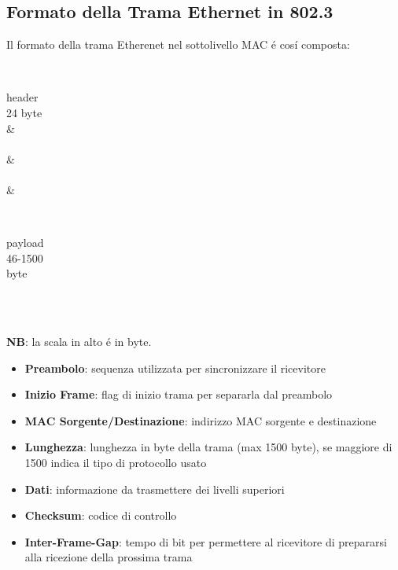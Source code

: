 \documentclass[12pt]{article}
\begin{document}
\clearpage
\subsection{Formato della Trama Ethernet in 802.3}\label{ieee-802-formato-trama-ethernet-802.3}
Il formato della trama Etherenet nel sottolivello MAC \'e cos\'i composta:\\
\begin{center}
\begin{bytefield}[bitwidth=1em]{32}
	\\
	\begin{rightwordgroup}{header\\24 byte}	
		\\ 
		 & \\ 
		\\ 
		 & \\
		\\ 
		 & \\
	\end{rightwordgroup}\\
	\begin{rightwordgroup}{payload\\46-1500\\byte}	
	\end{rightwordgroup}\\
	\\
\end{bytefield}
\end{center}
\textbf{NB}: la scala in alto \'e in byte.\\
\begin{itemize}
	\item \textbf{Preambolo}: sequenza utilizzata per sincronizzare il ricevitore
	\item \textbf{Inizio Frame}: flag di inizio trama per separarla dal preambolo
	\item \textbf{MAC Sorgente/Destinazione}: indirizzo MAC sorgente e destinazione
	\item \textbf{Lunghezza}: lunghezza in byte della trama (max 1500 byte), se maggiore di 1500 indica il tipo di protocollo 
	      usato
	\item \textbf{Dati}: informazione da trasmettere dei livelli superiori
	\item \textbf{Checksum}: codice di controllo
	\item \textbf{Inter-Frame-Gap}: tempo di bit per permettere al ricevitore di prepararsi alla ricezione della prossima 
	      trama
\end{itemize}
\end{document}
